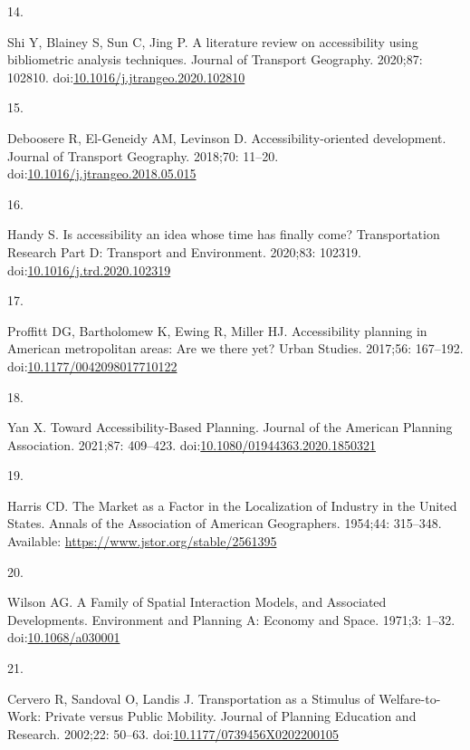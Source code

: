 \documentclass[10pt,letterpaper]{article}
\newlength{\cslhangindent}
\newlength{\csllabelwidth}
\newlength{\cslentryspacingunit} %
\newenvironment{CSLReferences}[2] %
 {%
  \setlength{\parindent}{0pt}
  \ifodd #1
  \let\oldpar\par
  \def\par{\hangindent=\cslhangindent\oldpar}
  \fi
  \setlength{\parskip}{#2\cslentryspacingunit}
 }%
 {}
\newcommand{\CSLLeftMargin}[1]{\parbox[t]{\csllabelwidth}{#1}}
\newcommand{\CSLRightInline}[1]{\parbox[t]{\linewidth - \csllabelwidth}{#1}\break}
\begin{document}
\begin{CSLReferences}{0}{0}
\leavevmode{}%
\CSLLeftMargin{14. }%
\CSLRightInline{Shi Y, Blainey S, Sun C, Jing P. A literature review on
accessibility using bibliometric analysis techniques. Journal of
Transport Geography. 2020;87: 102810.
doi:\href{https://doi.org/10.1016/j.jtrangeo.2020.102810}{10.1016/j.jtrangeo.2020.102810}}

\leavevmode{}%
\CSLLeftMargin{15. }%
\CSLRightInline{Deboosere R, El-Geneidy AM, Levinson D.
Accessibility-oriented development. Journal of Transport Geography.
2018;70: 11--20.
doi:\href{https://doi.org/10.1016/j.jtrangeo.2018.05.015}{10.1016/j.jtrangeo.2018.05.015}}

\leavevmode{}%
\CSLLeftMargin{16. }%
\CSLRightInline{Handy S. Is accessibility an idea whose time has finally
come? Transportation Research Part D: Transport and Environment.
2020;83: 102319.
doi:\href{https://doi.org/10.1016/j.trd.2020.102319}{10.1016/j.trd.2020.102319}}

\leavevmode{}%
\CSLLeftMargin{17. }%
\CSLRightInline{Proffitt DG, Bartholomew K, Ewing R, Miller HJ.
Accessibility planning in American metropolitan areas: Are we there yet?
Urban Studies. 2017;56: 167--192.
doi:\href{https://doi.org/10.1177/0042098017710122}{10.1177/0042098017710122}}

\leavevmode{}%
\CSLLeftMargin{18. }%
\CSLRightInline{Yan X. Toward Accessibility-Based Planning. Journal of
the American Planning Association. 2021;87: 409--423.
doi:\href{https://doi.org/10.1080/01944363.2020.1850321}{10.1080/01944363.2020.1850321}}

\leavevmode{}%
\CSLLeftMargin{19. }%
\CSLRightInline{Harris CD. The {Market} as a {Factor} in the
{Localization} of {Industry} in the {United} {States}. Annals of the
Association of American Geographers. 1954;44: 315--348. Available:
\url{https://www.jstor.org/stable/2561395}}

\leavevmode{}%
\CSLLeftMargin{20. }%
\CSLRightInline{Wilson AG. A Family of Spatial Interaction Models, and
Associated Developments. Environment and Planning A: Economy and Space.
1971;3: 1--32.
doi:\href{https://doi.org/10.1068/a030001}{10.1068/a030001}}

\leavevmode{}%
\CSLLeftMargin{21. }%
\CSLRightInline{Cervero R, Sandoval O, Landis J. Transportation as a
{Stimulus} of {Welfare}-to-{Work}: {Private} versus {Public} {Mobility}.
Journal of Planning Education and Research. 2002;22: 50--63.
doi:\href{https://doi.org/10.1177/0739456X0202200105}{10.1177/0739456X0202200105}}


\end{CSLReferences}
\end{document}
